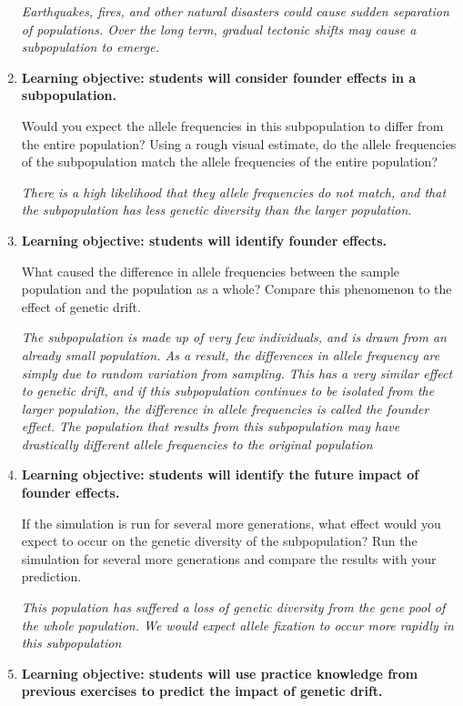 \documentclass[12pt]{article}
\begin{document}
\begin{spacing}{1.6}
\begin{enumerate}
\par \textit{Earthquakes, fires, and other natural disasters could cause sudden separation of populations. Over the long term, gradual tectonic shifts may cause a subpopulation to emerge.}
\item
\par \textbf{Learning objective: students will consider founder effects in a subpopulation.}
\par Would you expect the allele frequencies in this subpopulation to differ from the entire population? Using a rough visual estimate, do the allele frequencies of the subpopulation match the allele frequencies of the entire population?
\par \textit{There is a high likelihood that they allele frequencies do not match, and that the subpopulation has less genetic diversity than the larger population.}
\item
\par \textbf{Learning objective: students will identify founder effects.}
\par What caused the difference in allele frequencies between the sample population and the population as a whole? Compare this phenomenon to the effect of genetic drift.
\par \textit{The subpopulation is made up of very few individuals, and is drawn from an already small population. As a result, the differences in allele frequency are simply due to random variation from sampling. This has a very similar effect to genetic drift, and if this subpopulation continues to be isolated from the larger population, the difference in allele frequencies is called the founder effect. The population that results from this subpopulation may have drastically different allele frequencies to the original population}
\item
\par \textbf{Learning objective: students will identify the future impact of founder effects.}
\par If the simulation is run for several more generations, what effect would you expect to occur on the genetic diversity of the subpopulation? Run the simulation for several more generations and compare the results with your prediction.
\par \textit{This population has suffered a loss of genetic diversity from the gene pool of the whole population. We would expect allele fixation to occur more rapidly in this subpopulation}
\item
\par \textbf{Learning objective: students will use practice knowledge from previous exercises to predict the impact of genetic drift.}

\end{enumerate}
\end{spacing}
\end{document}
